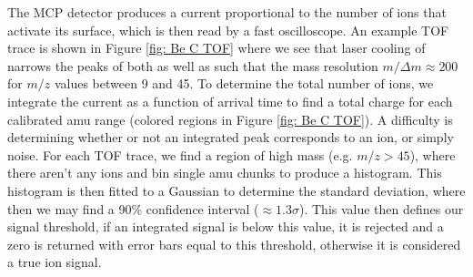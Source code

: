 The MCP detector produces a current proportional to the number of ions that activate its surface, which is then read by a fast oscilloscope. An example TOF trace is shown in Figure \ref{fig: Be C TOF} where we see that laser cooling of  narrows the peaks of both  as well as  such that the mass resolution $m/\Delta m \approx 200$ for $m/z$ values between 9 and 45. To determine the total number of ions, we integrate the current as a function of arrival time to find a total charge for each calibrated amu range (colored regions in Figure \ref{fig: Be C TOF}). A difficulty is determining whether or not an integrated peak corresponds to an ion, or simply noise. For each TOF trace, we find a region of high mass (e.g. $m/z > 45$), where there aren't any ions and bin single amu chunks to produce a histogram. This histogram is then fitted to a Gaussian to determine the standard deviation, where then we may find a 90\% confidence interval ($\approx 1.3 \sigma$). This value then defines our signal threshold, if an integrated signal is below this value, it is rejected and a zero is returned with error bars equal to this threshold, otherwise it is considered a true ion signal.